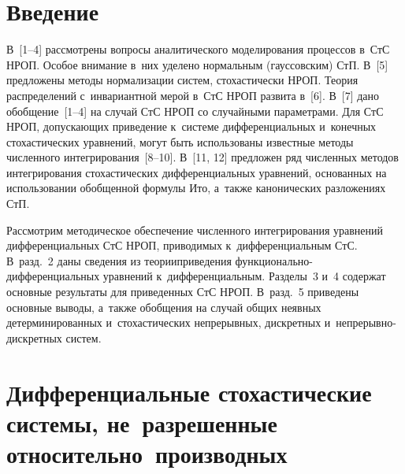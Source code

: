 
  



\thispagestyle{headings}

\begin{multicols}{2}

\label{st\stat}

\section{Введение}

В~[1--4] рассмотрены вопросы аналитического моделирования процессов в~СтС НРОП. 
Особое внимание в~них уделено нормальным (гауссовским) СтП. В~[5] предложены методы нормализации сис\-тем, сто\-ха\-сти\-че\-ски НРОП. 
Тео\-рия распределений с~инвариантной мерой в~СтС НРОП 
развита в~[6].
В~[7] дано обоб\-ще\-ние~[1--4] на случай СтС НРОП со случайными параметрами. Для 
СтС НРОП, до\-пус\-ка\-ющих приведение к~сис\-те\-ме дифференциальных и~конечных 
сто\-ха\-сти\-че\-ских уравнений, могут быть использованы известные методы чис\-лен\-но\-го 
интегрирования~[8--10]. В~[11, 12] предложен ряд чис\-лен\-ных методов 
интегрирования сто\-ха\-сти\-че\-ских дифференциальных уравнений, основанных на 
использовании обобщенной формулы Ито, а~так\-же канонических разложениях СтП.

Рассмотрим методическое обеспечение чис\-ленного интегрирования уравнений 
диф\-фе\-рен\-ци\-альных СтС НРОП, приводимых к~диф\-фе\-рен\-ци\-альным СтС. В~разд.~2 даны 
сведения из теории\linebreak \mbox{приведения} функ\-ци\-о\-наль\-но-диф\-фе\-рен\-ци\-аль\-ных уравнений 
к~дифференциальным. Разделы~3 и~4 содержат основные результаты для
приведенных СтС НРОП. В~разд.~5 приведены основные выводы, а~также обобщения 
на случай общих неявных детерминированных и~стохастических непрерывных, 
дискретных и~не\-пре\-рыв\-но-дис\-крет\-ных сис\-тем.


\section{Дифференциальные стохастические системы, не~разрешенные относительно~производных }


\end{multicols}
